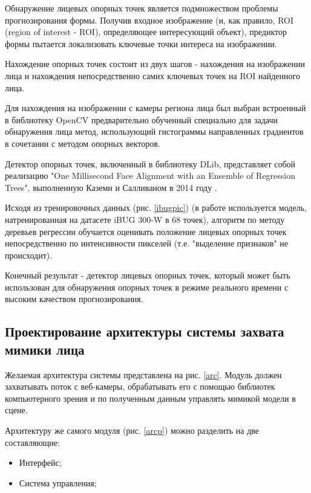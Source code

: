 Обнаружение лицевых опорных точек является подмножеством проблемы прогнозирования формы. Получив входное изображение (и, как правило, ROI (region of interest - ROI), определяющее интересующий объект), предиктор формы пытается локализовать ключевые точки интереса на изображении.

Нахождение опорных точек состоит из двух шагов - нахождения на изображении лица и нахождения непосредственно самих ключевых точек на ROI найденного лица.

Для нахождения на изображении с камеры региона лица был выбран встроенный в библиотеку OpenCV предварительно обученный специально для задачи обнаружения лица метод, использующий гистограммы направленных градиентов в сочетании с методом опорных векторов.

Детектор опорных точек, включенный в библиотеку DLib, представляет собой реализацию "One Millisecond Face Alignment with an Ensemble of Regression Trees", выполненную Каземи и Салливаном в 2014 году \cite{regtrees}.

Исходя из тренировочных данных (рис. \ref{ibugpic}) (в работе используется модель, натренированная на датасете  iBUG 300-W \cite{ibug} в 68 точек), алгоритм по методу деревьев регрессии обучается оценивать положение лицевых опорных точек непосредственно по интенсивности пикселей (т.е. "выделение признаков" не происходит).


Конечный результат - детектор лицевых опорных точек, который может быть использован для обнаружения опорных точек в режиме реального времени с высоким качеством прогнозирования.


\subsection{Проектирование архитектуры системы захвата мимики лица}

Желаемая архитектура системы представлена на рис. \ref{arc}. Модуль должен захватывать поток с веб-камеры, обрабатывать его с помощью библиотек компьютерного зрения и по полученным данным управлять мимикой модели в сцене.


Архитектуру же самого модуля (рис. \ref{arcp}) можно разделить на две составляющие:
\begin{itemize}
	\item Интерфейс;
	\item Система управления;
\end{itemize}

